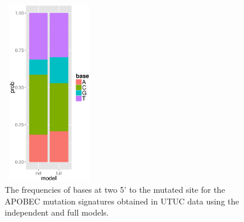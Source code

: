 \documentclass{article}
\begin{document}
\begin{figure}
\centering
\includegraphics[width=4cm,height=8cm]{UTUC_APOBEC_twoFivePrime.eps}
\caption{The frequencies of bases at two 5' to the mutated site for the APOBEC mutation signatures obtained in UTUC data using the independent and full models.}
\label{UTUC_APOBEC_twoFivePrime}
\end{figure}


\clearpage
\end{document}
